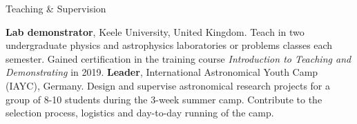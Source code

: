 \begin{rubric}{Teaching \& Supervision}

%
    \textbf{Lab demonstrator}, Keele University, United Kingdom. Teach in two undergraduate physics and astrophysics laboratories or problems classes each semester. Gained certification in the training course \emph{Introduction to Teaching and Demonstrating} in 2019.
%
    \textbf{Leader}, International Astronomical Youth Camp (IAYC), Germany. Design and supervise astronomical research projects for a group of 8-10 students during the 3-week summer camp. Contribute to the selection process, logistics and day-to-day running of the camp.%
    
\end{rubric}
